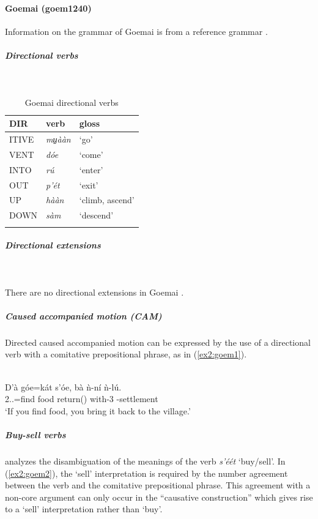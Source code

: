 \paragraph*{Goemai (goem1240)} \label{goem}

Information on the grammar of Goemai is from a reference grammar \citep{hellwigGrammarGoemai2011}.

\subparagraph{Directional verbs}~


\begin{table}[H]
	\caption{Goemai directional verbs} 
	\label{tab:goemV}
	\begin{tabular}{lll} %
		\lsptoprule
		DIR & verb & gloss   \\ %
		\midrule
		ITIVE & \textit{mu̠ààn} & `go' \\
		VENT & \textit{dóe} & `come' \\
		INTO& \textit{rú} & `enter' \\
		OUT & \textit{p'ét} & `exit' \\
		UP & \textit{hààn} & `climb, ascend' \\
		DOWN & \textit{sàm} & `descend' \\
		\lspbottomrule
	\end{tabular}
\end{table}

\subparagraph{Directional extensions}~

There are no directional extensions in Goemai \citep[10, 172]{hellwigGrammarGoemai2011}.

\subparagraph{Caused accompanied motion (CAM)}



Directed caused accompanied motion can be expressed by the use of a directional verb with a comitative prepositional phrase, as in (\ref{ex2:goem1}). 

\ea\label{ex2:goem1}
 \\
\gll D'à góe=kát s'óe, bà ǹ-ní ǹ-lú. \\
 2..=find food return() with-3 -settlement \\
\glt `If you find food, you bring it back to the village.'
\z 

\subparagraph{Buy-sell verbs}



\citet[214]{hellwigGrammarGoemai2011} analyzes the disambiguation of the meanings of the verb \textit{s'éét} `buy/sell'. In (\ref{ex2:goem2}), the `sell' interpretation is required by the number agreement between the verb and the comitative prepositional phrase. This agreement with a non-core argument can only occur in the ``causative construction'' which gives rise to a `sell' interpretation rather than `buy'. 

